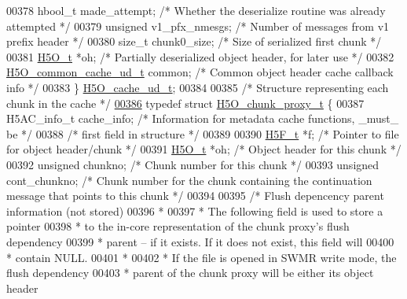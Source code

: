 \begin{DoxyCode}
00378     hbool\_t made\_attempt;               \textcolor{comment}{/* Whether the deserialize routine was already attempted */}
00379     \textcolor{keywordtype}{unsigned} v1\_pfx\_nmesgs;             \textcolor{comment}{/* Number of messages from v1 prefix header */}
00380     \textcolor{keywordtype}{size\_t} chunk0\_size;                 \textcolor{comment}{/* Size of serialized first chunk    */}
00381     \hyperlink{struct_h5_o__t}{H5O\_t} *oh;                          \textcolor{comment}{/* Partially deserialized object header, for later use */}
00382     \hyperlink{struct_h5_o__common__cache__ud__t}{H5O\_common\_cache\_ud\_t} common;       \textcolor{comment}{/* Common object header cache callback info */}
00383 \} \hyperlink{struct_h5_o__cache__ud__t}{H5O\_cache\_ud\_t};
00384 
00385 \textcolor{comment}{/* Structure representing each chunk in the cache */}
\hyperlink{struct_h5_o__chunk__proxy__t}{00386} \textcolor{keyword}{typedef} \textcolor{keyword}{struct }\hyperlink{struct_h5_o__chunk__proxy__t}{H5O\_chunk\_proxy\_t} \{
00387     H5AC\_info\_t cache\_info;    \textcolor{comment}{/* Information for metadata cache functions, \_must\_ be */}
00388                                 \textcolor{comment}{/* first field in structure */}
00389 
00390     \hyperlink{struct_h5_f__t}{H5F\_t} *f;                           \textcolor{comment}{/* Pointer to file for object header/chunk */}
00391     \hyperlink{struct_h5_o__t}{H5O\_t}       *oh;                    \textcolor{comment}{/* Object header for this chunk */}
00392     \textcolor{keywordtype}{unsigned}    chunkno;                \textcolor{comment}{/* Chunk number for this chunk */}
00393     \textcolor{keywordtype}{unsigned}    cont\_chunkno;           \textcolor{comment}{/* Chunk number for the chunk containing the continuation message
       that points to this chunk */}
00394 
00395     \textcolor{comment}{/* Flush depencency parent information (not stored) }
00396 \textcolor{comment}{     *}
00397 \textcolor{comment}{     * The following field is used to store a pointer }
00398 \textcolor{comment}{     * to the in-core representation of the chunk proxy's flush dependency}
00399 \textcolor{comment}{     * parent -- if it exists.  If it does not exist, this field will}
00400 \textcolor{comment}{     * contain NULL.}
00401 \textcolor{comment}{     *}
00402 \textcolor{comment}{     * If the file is opened in SWMR write mode, the flush dependency }
00403 \textcolor{comment}{     * parent of the chunk proxy will be either its object header }

\end{DoxyCode}
